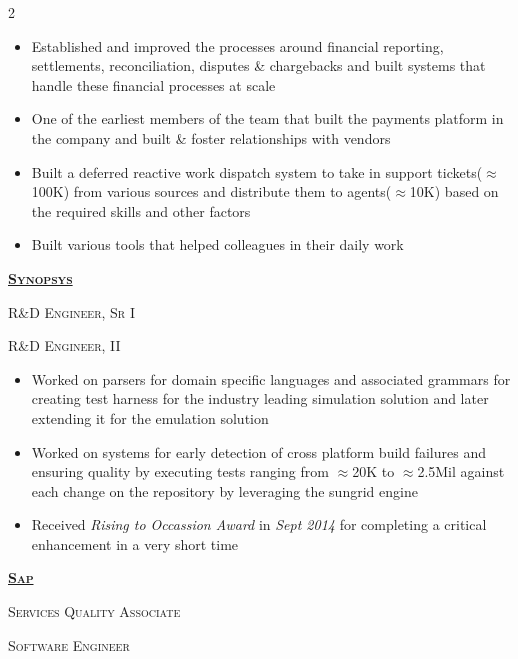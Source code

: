 \documentclass{article}
\begin{document}
\begin{parcolumns}[sloppy=true,sloppyspaces=true,colwidths={1=.3\textwidth,2=.7\textwidth},rulebetween=true]{2}
{\begin{itemize}[noitemsep,nolistsep]
\item Established and improved the processes around financial reporting, settlements, reconciliation, disputes \& chargebacks and built systems that handle these financial processes at scale
\item One of the earliest members of the team that built the payments platform in the company and built \& foster relationships with vendors
\item Built a deferred reactive work dispatch system to take in support tickets($\approx$100K) from various sources and distribute them to agents($\approx$10K) based on the required skills and other factors
\item Built various tools that helped colleagues in their daily work
\end{itemize}

{\raggedright{\textsc{\textbf{\href{https://www.synopsys.com/}{Synopsys}}}}} \hfill {}

{\raggedright{\textsc{R\&D Engineer, Sr I}}} \hfill {}

{\raggedright{\textsc{R\&D Engineer, II}}} \hfill {}

\begin{itemize}[noitemsep,nolistsep]
\item Worked on parsers for domain specific languages and associated grammars for creating test harness for the industry leading simulation solution and later extending it for the emulation solution
\item Worked on systems for early detection of cross platform build failures and ensuring quality by executing tests ranging from $\approx$20K to $\approx$2.5Mil against each change on the repository by leveraging the sungrid engine
\item Received \textit{Rising to Occassion Award} in \textit{Sept 2014} for completing a critical enhancement in a very short time
\end{itemize}

{\raggedright{\textsc{\textbf{\href{https://www.sap.com/index.html}{Sap}}}}} \hfill {}

{\raggedright{\textsc{Services Quality Associate}}} \hfill {}

{\raggedright{\textsc{Software Engineer}}} \hfill {}

}
\end{parcolumns}
\end{document}
